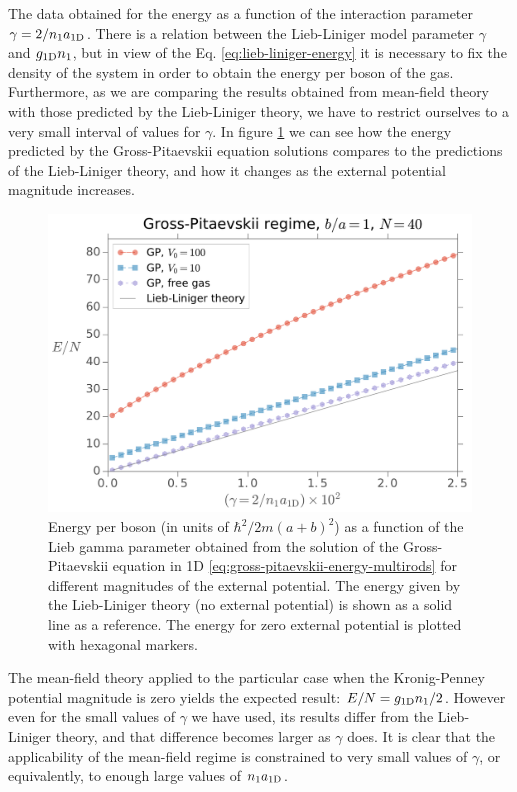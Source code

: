 The data obtained for the energy as a function of the interaction parameter
$\gamma = 2 / {{n}_1} a_{ \mathrm{1D} }$. There is a relation between the
Lieb-Liniger model parameter $\gamma$ and $g_{ \mathrm{1D} } {{n}_1}$, but in view of
the Eq. \eqref{eq:lieb-liniger-energy} it is necessary to fix the density of the
system in order to obtain the energy per boson of the gas. Furthermore, as we
are comparing the results obtained from mean-field theory with those predicted
by the Lieb-Liniger theory, we have to restrict ourselves to a very small
interval of values for $\gamma$. In figure
\ref{fig:gross-pitaevskii-energy-as-gamma-nb-40} we can see how the energy
predicted by the Gross-Pitaevskii equation solutions compares to the predictions
of the Lieb-Liniger theory, and how it changes as the external potential
magnitude increases.
%
\begin{figure}[t!]
  \centering
  \includegraphics[width=0.75\linewidth]{./figures/gp_energy-as-gamma_Nb-40}
  \caption{Energy per boson (in units of $\hbar^2 / 2m(a+b)^2$) as a function of
    the Lieb gamma parameter obtained from the solution of the Gross-Pitaevskii
    equation in 1D \eqref{eq:gross-pitaevskii-energy-multirods} for different
    magnitudes of the external potential. The energy given by the Lieb-Liniger
    theory (no external potential) is shown as a solid line as a reference. The
    energy for zero external potential is plotted with hexagonal markers.}
  \label{fig:gross-pitaevskii-energy-as-gamma-nb-40}
\end{figure}
%
The mean-field theory applied to the particular case when the Kronig-Penney
potential magnitude is zero yields the expected result: $E / N = g_{ \mathrm{1D} }
  {{n}_1} / 2$. However even for the small values of $\gamma$ we have used,
its results differ from the Lieb-Liniger theory, and that difference becomes
larger as $\gamma$ does. It is clear that the applicability of the mean-field
regime is constrained to very small values of $\gamma$, or equivalently, to
enough large values of ${{n}_1} a_{ \mathrm{1D} }$.


